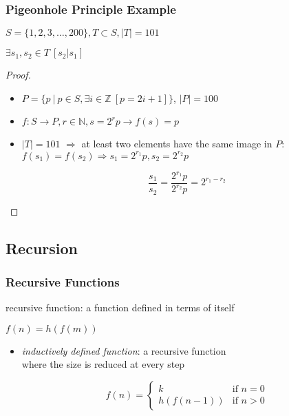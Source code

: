 \documentclass[dvipsnames]{beamer}
\begin{document}
\begin{frame}
  \frametitle{Pigeonhole Principle Example}

  \begin{theorem}
    $S = \{1,2,3,\dots,200\}, T \subset S, |T| = 101$

    $\exists s_1,s_2 \in T~[s_2 | s_1]$
  \end{theorem}

  \pause
  \begin{proof}
    \begin{itemize}
      \item $P=\{p~|~p \in S, \exists i \in \mathbb{Z}~[p=2i+1]\}$, $|P|=100$

      \pause
      \item $f: S \rightarrow P, r \in \mathbb{N}, s = 2^r p \rightarrow f(s) = p$
      \item $|T|=101$ $\Rightarrow$ at least two elements have the same image in $P$:\\
        $f(s_1)=f(s_2) \Rightarrow s_1 = 2^{r_1} p, s_2 = 2^{r_2} p$

      \pause
      \[
        \frac {s_1} {s_2} = \frac {2^{r_1} p} {2^{r_2} p} = 2^{r_1 - r_2}
      \]
    \end{itemize}
  \end{proof}
\end{frame}

\subsection{Recursion}

\begin{frame}
  \frametitle{Recursive Functions}

  \begin{definition}
    \alert{recursive function}: a function defined in terms of itself

    \medskip
    $f(n) = h(f(m))$
  \end{definition}

  \begin{itemize}
    \item \emph{inductively defined function}: a recursive function\\
      where the size is reduced at every step

    \medskip
    \[
      f(n) =
        \begin{cases}
          k         & \mbox{if } n = 0\\
          h(f(n-1)) & \mbox{if } n > 0
        \end{cases}
    \]
  \end{itemize}
\end{frame}
\end{document}
